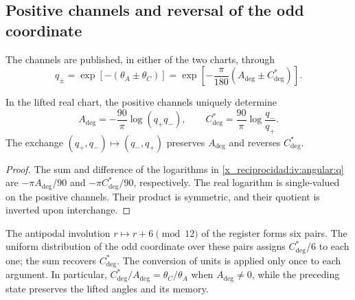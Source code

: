 \subsection{Positive channels and reversal of the odd coordinate}
\label{x_reciprocidad:iv:angular:canales}

The channels are published, in either of the two charts, through
\begin{equation}
 q_\pm=\exp[-(\theta_A\pm\theta_C)]
 =\exp\!\left[-\frac{\pi}{180}
                   (A_{\deg}\pm C^*_{\deg})\right].
 \label{x_reciprocidad:iv:angular:q}
\end{equation}

\begin{proposition}
\label{x_reciprocidad:iv:angular:inversion}
In the lifted real chart, the positive channels uniquely
determine
\begin{equation}
 A_{\deg}=-\frac{90}{\pi}\log(q_+q_-),\qquad
 C^*_{\deg}=\frac{90}{\pi}\log\frac{q_-}{q_+}.
 \label{x_reciprocidad:iv:angular:recuperacion}
\end{equation}
The exchange \((q_+,q_-)\mapsto(q_-,q_+)\) preserves \(A_{\deg}\) and reverses \(C^*_{\deg}\).
\end{proposition}
\begin{proof}
The sum and difference of the logarithms in
\eqref{x_reciprocidad:iv:angular:q} are \(-\pi A_{\deg}/90\) and
\(-\pi C^*_{\deg}/90\), respectively. The real logarithm
is single-valued on the positive channels. Their product is
symmetric, and their quotient is inverted upon interchange.
\end{proof}

The antipodal involution \(r\mapsto r+6\pmod {12}\) of the
register forms six pairs. The uniform distribution of the
odd coordinate over these pairs assigns
\(C^*_{\deg}/6\) to each one; the sum recovers
\(C^*_{\deg}\). The conversion of units is applied
only once to each argument. In particular,
\(C^*_{\deg}/A_{\deg}=\theta_C/\theta_A\) when
\(A_{\deg}\ne0\), while the preceding state preserves
the lifted angles and its memory.
